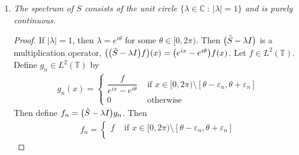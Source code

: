 \documentclass{article} %
\theoremstyle{plain}
\newcommand{\E}{\varepsilon}
\def\Cx{\mathbb{C}}
\numberwithin{equation}{section} %
\numberwithin{figure}{section} %
\numberwithin{table}{section} %
\begin{document}
\begin{enumerate}[\it a)]
\begin{proof}
            \begin{align*}
                \mathcal{F}(S(y)_n) = \tilde{S}\qty(\sum_{n\in\mathbb{Z}} a_n e^{inx}) = e^{ix}\sum_{n\in\mathbb{Z}}a_ne^{inx} = \sum_{n\in\mathbb{Z}}a_ne^{i(n+1)x}
            \end{align*}
            where $\tilde{S}$ is the shift operator in $L^2(\mathbb{T})$ ($\tilde{S} = \mathcal{F}\circ S$).
            Let $|\lambda| < 1$.  Then $\qty(\tilde{S} - \lambda I)g = \sum_{n\in\mathbb{Z}}a_ne^{inx}$ where $g$ is defined as
            \begin{align*}
                g = \frac{\sum_{n\in\mathbb{Z}}a_n e^{inx}}{e^{ix} - \lambda}
            \end{align*}
            since
            \begin{align*}
                \qty(\tilde{S} - \lambda I)\qty(\frac{\sum_{n\in\mathbb{Z}}a_n e^{inx}}{e^{ix} - \lambda}) = \frac{e^{ix}\sum_{n\in\mathbb{Z}}a_n e^{inx} - \lambda\sum_{n\in\mathbb{Z}}a_n e^{inx}}{e^{ix} - \lambda} = \sum_{n\in\mathbb{Z}}a_n e^{inx}
            \end{align*}
            Thus $(\tilde{S} - \lambda I)$ is surjective, which shows $(S - \lambda I)$ is surjective.
        \end{proof}
    \item
        \emph{The spectrum of $S$ consists of the unit circle $\{\lambda \in \Cx\ :\ |\lambda| = 1\}$ and is purely continuous.}
        \begin{proof}
            If $|\lambda| = 1$, then $\lambda = e^{i\theta}$ for some $\theta \in [0, 2\pi)$.  Then $\qty(\tilde{S} - \lambda I)$ is a multiplication operator, $\qty(\qty(\tilde{S} - \lambda I)f)(x) = \qty(e^{ix} - e^{i\theta})f(x)$.  Let $f \in L^2(\mathbb{T})$.  Define $g_n \in L^2(\mathbb{T})$ by
            \begin{align*}
                g_n(x) = \begin{cases}
                    \dfrac{f}{e^{ix} - e^{i\theta}} & \text{ if } x \in [0, 2\pi) \setminus [\theta - \E_n, \theta + \E_n] \\
                    0 & \text{ otherwise}
                \end{cases}
            \end{align*}
            Then define $f_n = \qty(\tilde{S} - \lambda I)g_n$.  Then
            \begin{align*}
                f_n = \begin{cases}
                    f & \text{ if } x \in [0, 2\pi) \setminus [\theta - \E_n, \theta + \E_n] \\

\end{cases}
\end{align*}
\end{proof}
\end{enumerate}
\end{document}

